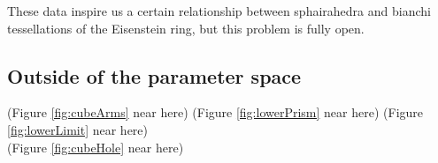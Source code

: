 \documentclass[suppldata, dvipdfmx]{interact}
\theoremstyle{plain}%
\theoremstyle{definition}
\theoremstyle{remark}
\theoremstyle{problemstyle}
\begin{document}
These data inspire us a certain relationship between sphairahedra and bianchi tessellations of the Eisenstein ring, but this problem is fully open.

%
%
%
%

\subsection{Outside of the parameter space}

\noindent(Figure \ref{fig:cubeArms} near here)
(Figure \ref{fig:lowerPrism} near here)
(Figure \ref{fig:lowerLimit} near here)\\
(Figure \ref{fig:cubeHole}
 near here)
\end{document}
